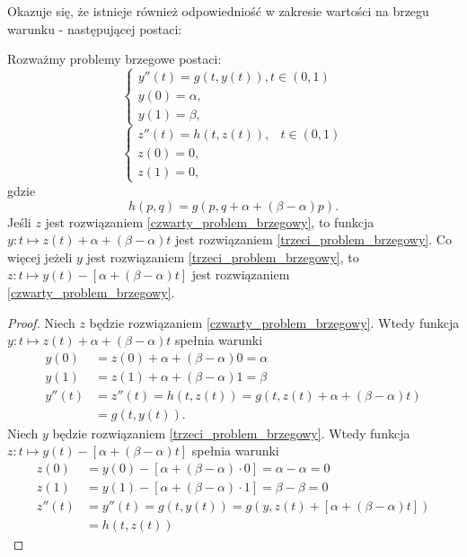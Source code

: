 Okazuje się, że istnieje również odpowiedniość w zakresie wartości na brzegu warunku - następującej postaci:
\begin{theorem}
Rozważmy problemy brzegowe postaci:
\begin{equation}\label{trzeci_problem_brzegowy}
\left\{\begin{array}{ll}
y''(t)=g(t,y(t)), t \in(0,1)& \\
y(0)=\alpha, & \\
y(1)=\beta,
\end{array}\right.
\end{equation}
\begin{equation}\label{czwarty_problem_brzegowy}
\left\{\begin{array}{ll}
z''(t)=h(t,z(t)), & t \in (0,1)\\
z(0)= 0, & \\
z(1)= 0,
\end{array}\right.
\end{equation}
gdzie 
$$
h(p,q)= g(p,q+\alpha + (\beta - \alpha)p).
$$
Jeśli $z$ jest rozwiązaniem \eqref{czwarty_problem_brzegowy}, to funkcja $y: t \mapsto z(t) + \alpha + (\beta - \alpha)t$ jest rozwiązaniem \eqref{trzeci_problem_brzegowy}. Co więcej jeżeli $y$ jest rozwiązaniem \eqref{trzeci_problem_brzegowy}, to $z: t \mapsto y(t) - [\alpha + (\beta - \alpha)t]$ jest rozwiązaniem \eqref{czwarty_problem_brzegowy}.
\end{theorem}
\begin{proof}
Niech $z$ będzie rozwiązaniem \eqref{czwarty_problem_brzegowy}. Wtedy funkcja $y: t \mapsto z(t) + \alpha + (\beta - \alpha)t$ spełnia warunki
\begin{align*}
y(0)&= z(0) + \alpha + (\beta - \alpha)0 = \alpha \\
y(1)&= z(1) + \alpha + (\beta - \alpha)1 = \beta \\
y''(t)&= z''(t) = h(t,z(t)) = g(t,z(t) + \alpha + (\beta - \alpha)t) \\
&= g(t,y(t)).
\end{align*}
Niech $y$ będzie rozwiązaniem \eqref{trzeci_problem_brzegowy}. Wtedy funkcja $z: t \mapsto y(t) - [\alpha + (\beta - \alpha)t]$ spełnia warunki 
\begin{align*}
z(0) &= y(0) - [\alpha + (\beta - \alpha)\cdot 0] = \alpha - \alpha = 0 \\
z(1) &= y(1) - [\alpha + (\beta - \alpha)\cdot 1] = \beta - \beta = 0 \\
z''(t) &= y''(t) = g(t,y(t)) = g(y, z(t) + [\alpha +(\beta - \alpha)t]) \\
&= h(t,z(t))
\end{align*} 
\end{proof}

